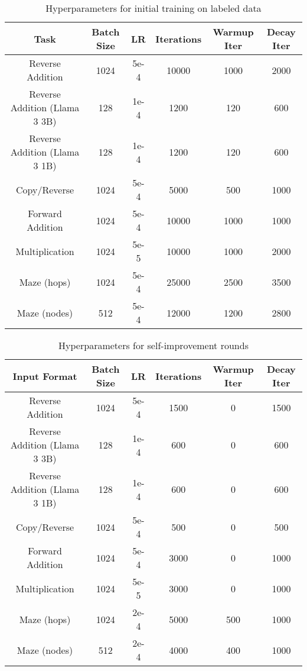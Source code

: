\begin{table}[ht]
\caption{Hyperparameters for initial training on labeled data}
\footnotesize
\vspace{1mm}
\centering
\small
\setlength{\tabcolsep}{4pt} %
\renewcommand{\arraystretch}{0.5}
{
\begin{tabular}{cccccc}
\toprule
Task & Batch Size & LR & Iterations & Warmup Iter & Decay Iter \\
\midrule 
Reverse Addition &  1024 &  5e-4 & 10000 & 1000 & 2000  \\
Reverse Addition (Llama 3 3B) &  128 &  1e-4 & 1200 & 120 & 600  \\
Reverse Addition (Llama 3 1B) &  128 &  1e-4 & 1200 & 120 & 600  \\
Copy/Reverse & 1024 &  5e-4 & 5000 & 500 & 1000  \\
Forward Addition & 1024 &  5e-4 & 10000 & 1000 & 1000  \\
Multiplication & 1024 &  5e-5 & 10000 & 1000 & 2000  \\
Maze (hops) & 1024 &  5e-4 & 25000 & 2500 & 3500  \\
Maze (nodes) & 512 &  5e-4 & 12000 & 1200 & 2800  \\

\bottomrule
\end{tabular}
}
\label{table:hyperparam_base}
\end{table}


\begin{table}[ht]
\caption{Hyperparameters for self-improvement rounds}
\footnotesize
\vspace{1mm}
\centering
\small
\setlength{\tabcolsep}{4pt} %
\renewcommand{\arraystretch}{0.5}
{
\begin{tabular}{cccccc}
\toprule
Input Format & Batch Size & LR & Iterations & Warmup Iter & Decay Iter \\
\midrule 
Reverse Addition &  1024 &  5e-4 & 1500 & 0 & 1500  \\
Reverse Addition (Llama 3 3B) &  128 &  1e-4 & 600 & 0 & 600  \\
Reverse Addition (Llama 3 1B) &  128 &  1e-4 & 600 & 0 & 600  \\
Copy/Reverse & 1024 &  5e-4 & 500 & 0 & 500  \\
Forward Addition & 1024 &  5e-4 & 3000 & 0 & 1000  \\
Multiplication & 1024 &  5e-5 & 3000 & 0 & 1000  \\
Maze (hops) & 1024 &  2e-4 & 5000 & 500 & 1000  \\
Maze (nodes) & 512 &  2e-4 & 4000 & 400 & 1000  \\
\bottomrule
\end{tabular}
}
\label{table:hyperparam_si}
\end{table}



